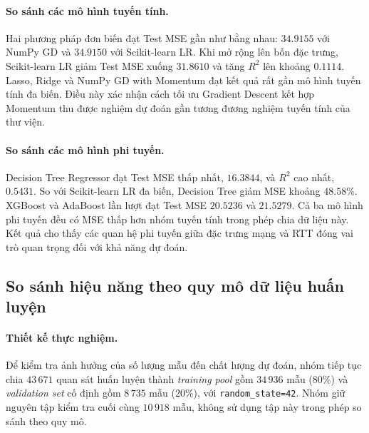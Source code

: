 \paragraph{So sánh các mô hình tuyến tính.}

Hai phương pháp đơn biến đạt Test MSE gần như bằng nhau:
$34.9155$ với NumPy GD và $34.9150$ với Scikit-learn LR.
Khi mở rộng lên bốn đặc trưng, Scikit-learn LR giảm Test MSE
xuống $31.8610$ và tăng $R^2$ lên khoảng $0.1114$.
Lasso, Ridge và NumPy GD with Momentum đạt kết quả rất gần
mô hình tuyến tính đa biến. Điều này xác nhận cách tối ưu
Gradient Descent kết hợp Momentum thu được nghiệm dự đoán
gần tương đương nghiệm tuyến tính của thư viện.

\paragraph{So sánh các mô hình phi tuyến.}

Decision Tree Regressor đạt Test MSE thấp nhất, $16.3844$,
và $R^2$ cao nhất, $0.5431$. So với Scikit-learn LR đa biến,
Decision Tree giảm MSE khoảng $48.58\%$.
XGBoost và AdaBoost lần lượt đạt Test MSE $20.5236$ và
$21.5279$. Cả ba mô hình phi tuyến đều có MSE thấp hơn nhóm
tuyến tính trong phép chia dữ liệu này. Kết quả cho thấy
các quan hệ phi tuyến giữa đặc trưng mạng và RTT đóng vai trò
quan trọng đối với khả năng dự đoán.


\subsection{So sánh hiệu năng theo quy mô dữ liệu huấn luyện}
\label{subsec:training-size-comparison}

\paragraph{Thiết kế thực nghiệm.}

Để kiểm tra ảnh hưởng của số lượng mẫu đến chất lượng dự đoán,
nhóm tiếp tục chia $43\,671$ quan sát huấn luyện thành
\textit{training pool} gồm $34\,936$ mẫu ($80\%$) và
\textit{validation set} cố định gồm $8\,735$ mẫu ($20\%$),
với \texttt{random\_state=42}.
Nhóm giữ nguyên tập kiểm tra cuối cùng $10\,918$ mẫu,
không sử dụng tập này trong phép so sánh theo quy mô.

